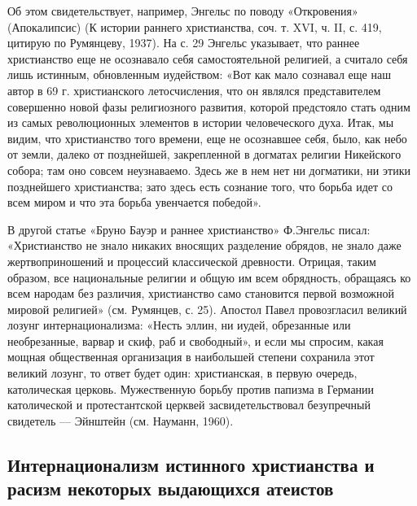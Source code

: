 Об этом свидетельствует, например, Энгельс по поводу «Откровения»
(Апокалипсис) (К истории раннего христианства, соч. т. XVI, ч. II, с.
419, цитирую по Румянцеву, 1937). На с. 29 Энгельс указывает, что
раннее христианство еще не осознавало себя самостоятельной религией, а
считало себя лишь истинным, обновленным иудейством: «Вот как мало
сознавал еще наш автор в 69 г. христианского летосчисления, что он
являлся представителем совершенно новой фазы религиозного развития,
которой предстояло стать одним из самых революционных элементов в
истории человеческого духа. Итак, мы видим, что христианство того
времени, еще не осознавшее себя, было, как небо от земли, далеко от
позднейшей, закрепленной в догматах религии Никейского собора; там оно
совсем неузнаваемо. Здесь же в нем нет ни догматики, ни этики
позднейшего христианства; зато здесь есть сознание того, что борьба
идет со всем миром и что эта борьба увенчается победой».

В другой статье «Бруно Бауэр и раннее христианство» Ф.Энгельс писал:
«Христианство не знало никаких вносящих разделение обрядов, не знало
даже жертвоприношений и процессий классической древности. Отрицая,
таким образом, все национальные религии и общую им всем обрядность,
обращаясь ко всем народам без различия, христианство само становится
первой возможной мировой религией» (см. Румянцев, с. 25). Апостол
Павел провозгласил великий лозунг интернационализма: «Несть эллин, ни
иудей, обрезанные или необрезанные, варвар и скиф, раб и свободный», и
если мы спросим, какая мощная общественная организация в наибольшей
степени сохранила этот великий лозунг, то ответ будет один:
христианская, в первую очередь, католическая церковь. Мужественную
борьбу против папизма в Германии католической и протестантской церквей
засвидетельствовал безупречный свидетель --- Эйнштейн (см. Науманн,
1960).

\subsection{Интернационализм истинного христианства и расизм некоторых
выдающихся атеистов}

